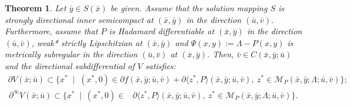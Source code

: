 \documentclass[12pt,twoside,reqno]{amsart}
\newtheorem{theorem}{Theorem}[section]
\theoremstyle{definition}
\numberwithin{equation}{section}
\begin{document}
\begin{theorem}\label{thm: directional subdifferential of V with sdic of s}
Let $\bar{y} \in S(\bar{x})$ be given. Assume that the solution mapping $S$ is strongly directional inner semicompact at $(\bar{x}, \bar{y})$ in the direction $(\bar u, \bar v)$.  
Furthermore, assume that $P$ is Hadamard differentiable at $(\bar{x}, \bar{y})$ in the direction $(\bar u, \bar v)$, weak* strictly Lipschitzian at $(\bar{x}, \bar y)$ and $\Psi(x, y) := \Lambda - P(x, y)$ is metrically subregular in the direction $(\bar u, \bar v)$ at $(\bar{x}, \bar{y})$. Then, $\bar v\in C(\bar{x}, \bar{y}; \bar{u})$ and the directional subdifferential of $V$ satisfies:
\begin{equation*}
\begin{split}
    \partial V(\bar{x}; \bar u) \subset 
    \{ x^*  \;\mid\;
        (x^*, 0) \in \partial f(\bar{x}, \bar{y}; \bar u, \bar v) + \partial \langle z^*, P \rangle(\bar{x}, \bar{y}; \bar u, \bar v),~z^* \in \mathcal{M}_P(\bar{x}, \bar{y}; \Lambda; \bar u, \bar v ) \};
\end{split}
\end{equation*}
\begin{equation*}
\begin{split}
    \partial^\infty V(\bar{x}; \bar u) \subset \{ x^* ~\mid ~ 
 (x^*, 0) \in &\partial \langle z^*, P \rangle(\bar{x}, \bar{y}; \bar u, \bar v),~ z^* \in \mathcal{M}_P(\bar{x}, \bar{y};\Lambda; \bar u, \bar{v})
    \}.
\end{split}
\end{equation*}
\end{theorem}
\end{document}
